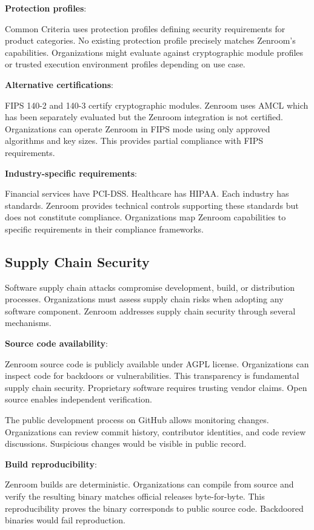 \textbf{Protection profiles}:

Common Criteria uses protection profiles defining security
requirements for product categories. No existing protection profile
precisely matches Zenroom's capabilities. Organizations might evaluate
against cryptographic module profiles or trusted execution environment
profiles depending on use case.

\textbf{Alternative certifications}:

FIPS 140-2 and 140-3 certify cryptographic modules. Zenroom uses AMCL
which has been separately evaluated but the Zenroom integration is not
certified. Organizations can operate Zenroom in FIPS mode using only
approved algorithms and key sizes. This provides partial compliance
with FIPS requirements.

\textbf{Industry-specific requirements}:

Financial services have PCI-DSS. Healthcare has HIPAA. Each industry
has standards. Zenroom provides technical controls supporting these
standards but does not constitute compliance. Organizations map
Zenroom capabilities to specific requirements in their compliance
frameworks.

\subsection{Supply Chain Security}

Software supply chain attacks compromise development, build, or
distribution processes. Organizations must assess supply chain risks
when adopting any software component. Zenroom addresses supply chain
security through several mechanisms.

\textbf{Source code availability}:

Zenroom source code is publicly available under AGPL
license. Organizations can inspect code for backdoors or
vulnerabilities. This transparency is fundamental supply chain
security. Proprietary software requires trusting vendor claims. Open
source enables independent verification.

The public development process on GitHub allows monitoring
changes. Organizations can review commit history, contributor
identities, and code review discussions. Suspicious changes would be
visible in public record.

\textbf{Build reproducibility}:

Zenroom builds are deterministic. Organizations can compile from
source and verify the resulting binary matches official releases
byte-for-byte. This reproducibility proves the binary corresponds to
public source code. Backdoored binaries would fail reproduction.

